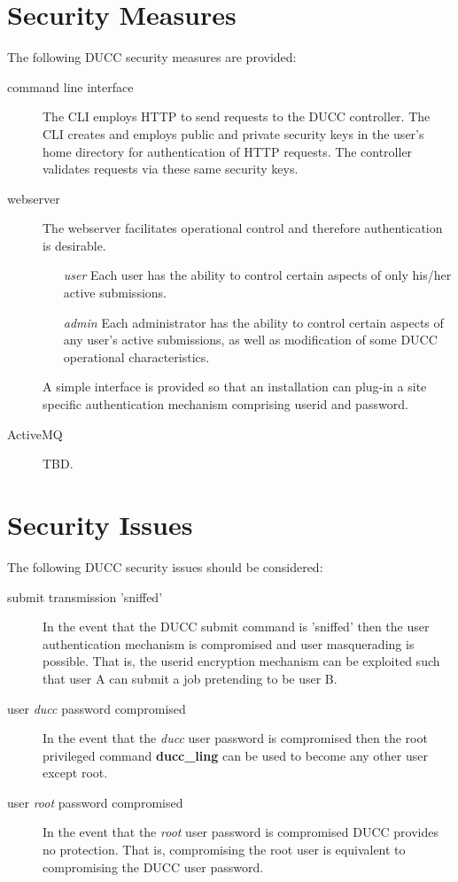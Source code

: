     
    \section{Security Measures}
    The following DUCC security measures are provided:

    \begin{description}
    \item[command line interface] The CLI employs HTTP to send requests
    to the DUCC controller.  The CLI creates and employs public and private
    security keys in the user's home directory for authentication of HTTP
    requests.  The controller validates requests via these same security keys.
    \item[webserver] The webserver facilitates operational control and
    therefore authentication is desirable. 
    \begin{itemize}
    \item[\textit{user}] Each user has the ability to control certain aspects of
    only his/her active submissions.
    \item[\textit{admin}] Each administrator has the ability to control certain
    aspects of any user's active submissions, as well as modification of some
    DUCC operational characteristics.
    \end{itemize}
    A simple interface is provided so
    that an installation can plug-in a site specific authentication mechanism
    comprising userid and password.
    \item[ActiveMQ] TBD.
    \end{description}
    
    \section{Security Issues}
    The following DUCC security issues should be considered:
    
    \begin{description}
    \item[submit transmission 'sniffed'] In the event that the DUCC submit
    command is 'sniffed' then the user authentication mechanism is compromised
    and user masquerading is possible.  That is, the userid encryption mechanism
    can be exploited such that user A can submit a job pretending to be user B.
    \item[user \textit{ducc} password compromised] In the event that the \textit{ducc}
    user password is compromised then the root privileged command
    \textbf{ducc\_ling} can be used to become any other user except root.
    \item[user \textit{root} password compromised] In the event that the
    \textit{root} user password is compromised DUCC provides no protection. 
    That is, compromising the root user is equivalent to compromising the DUCC
    user password.
    \end{description}  
     
